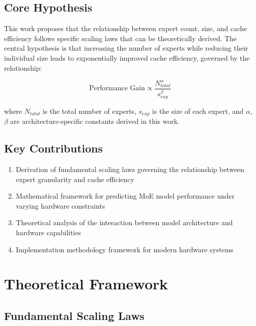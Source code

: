 \documentclass[11pt]{article}
\begin{document}
\subsection{Core Hypothesis}

This work proposes that the relationship between expert count, size, and cache efficiency follows specific scaling laws that can be theoretically derived. The central hypothesis is that increasing the number of experts while reducing their individual size leads to exponentially improved cache efficiency, governed by the relationship:

\begin{equation}
\text{Performance Gain} \propto \frac{N_{total}^{\alpha}}{s_{exp}^{\beta}}
\end{equation}

where $N_{total}$ is the total number of experts, $s_{exp}$ is the size of each expert, and $\alpha$, $\beta$ are architecture-specific constants derived in this work.

\subsection{Key Contributions}

\begin{enumerate}
    \item Derivation of fundamental scaling laws governing the relationship between expert granularity and cache efficiency
    \item Mathematical framework for predicting MoE model performance under varying hardware constraints
    \item Theoretical analysis of the interaction between model architecture and hardware capabilities
    \item Implementation methodology framework for modern hardware systems
\end{enumerate}

\section{Theoretical Framework}

\subsection{Fundamental Scaling Laws}
\end{document}
